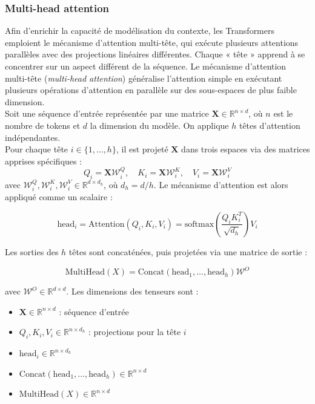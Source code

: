 \subsubsection{Multi-head attention}

Afin d’enrichir la capacité de modélisation du contexte, les Transformers emploient le mécanisme d’attention multi-tête, qui exécute plusieurs attentions parallèles avec des projections linéaires différentes. Chaque « tête » apprend à se concentrer sur un aspect différent de la séquence. Le mécanisme d’attention multi-tête (\textit{multi-head attention}) généralise l’attention simple en exécutant plusieurs opérations d’attention en parallèle sur des sous-espaces de plus faible dimension.\\

Soit une séquence d’entrée représentée par une matrice $\mathbf{X} \in \mathbb{R}^{n \times d}$, où $n$ est le nombre de tokens et $d$ la dimension du modèle. On applique $h$ têtes d’attention indépendantes.\\

Pour chaque tête $i \in \{1, \dots, h\}$, il est projeté $\mathbf{X}$ dans trois espaces via des matrices apprises spécifiques :
\begin{equation}
Q_i = \mathbf{X} \mathcal{W}^Q_i, \quad K_i =  \mathbf{X} \mathcal{W}^K_i, \quad V_i =  \mathbf{X} \mathcal{W}^V_i   
\end{equation}
avec $\mathcal{W}^Q_i, \mathcal{W}^K_i, \mathcal{W}^V_i \in \mathbb{R}^{d \times d_h}$, où $d_h = d / h$.
Le mécanisme d’attention est alors appliqué comme un scalaire :

\begin{equation}
\text{head}_i = \text{Attention}(Q_i, K_i, V_i) = \text{softmax}\left(\frac{Q_i K_i^T}{\sqrt{d_h}}\right) V_i
\end{equation}

Les sorties des $h$ têtes sont concaténées, puis projetées via une matrice de sortie :

\begin{equation}
\text{MultiHead}(X) = \text{Concat}(\text{head}_1, \dots, \text{head}_h) \mathcal{W}^O
\end{equation}

avec $\mathcal{W}^O \in \mathbb{R}^{d \times d}$. Les dimensions des tenseurs sont : 

\begin{itemize}
    \item $\mathbf{X} \in \mathbb{R}^{n \times d}$ : séquence d’entrée
    \item $Q_i, K_i, V_i \in \mathbb{R}^{n \times d_h}$ : projections pour la tête $i$
    \item $\text{head}_i \in \mathbb{R}^{n \times d_h}$
    \item $\text{Concat}(\text{head}_1, ..., \text{head}_h) \in \mathbb{R}^{n \times d}$
    \item $\text{MultiHead}(X) \in \mathbb{R}^{n \times d}$
\end{itemize}

